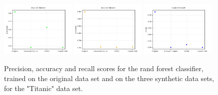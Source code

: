\documentclass{article}
\begin{document}
\begin{figure}[h!]
	\centering
	\includegraphics[width=0.32\textwidth]{../plots/results/income_precision.png}
	\includegraphics[width=0.32\textwidth]{../plots/results/income_accuracy.png}
	\includegraphics[width=0.32\textwidth]{../plots/results/income_recall.png}

	\caption{Precision, accuracy and recall scores for the rand forest classifier, trained on the original data set and on the three synthetic data sets, for the "Titanic" data set.}
	\label{scores_income}
\end{figure}
\end{document}
